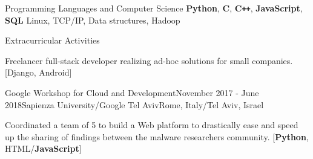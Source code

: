 \documentclass{resume}
\begin{document}

\begin{rSection}{Programming Languages and Computer Science}
  \textbf{Python}, \textbf{C}, \textbf{C\texttt{++}}, \textbf{JavaScript}, \textbf{SQL} \hfill Linux, TCP/IP, Data structures, Hadoop
\end{rSection}


\begin{rSection}{Extracurricular Activities}

\begin{rSubsection}{}{}{}{}
\item Freelancer full-stack developer realizing ad-hoc solutions for small companies. [Django, Android]
\end{rSubsection}
\begin{rSubsection}{Google Workshop for Cloud and Development}{November 2017 - June 2018}{Sapienza University/Google Tel Aviv}{Rome, Italy/Tel Aviv, Israel}
\item Coordinated a team of 5 to build a Web platform to drastically ease and speed up the sharing of findings between the malware researchers community. [\textbf{Python}, HTML/\textbf{JavaScript}]
\end{rSubsection}
\end{rSection}
\end{document}
